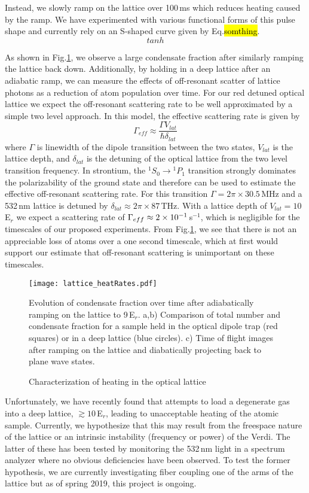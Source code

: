 Instead, we slowly ramp on the lattice over 100\,ms which reduces heating caused by the ramp. 
We have experimented with various functional forms of this pulse shape and currently rely on an S-shaped curve given by Eq.\hl{somthing}.
\begin{equation}
	tanh
\end{equation}

As shown in Fig.\;\ref{fig:heatingRates}, we observe a large condensate fraction after similarly ramping the lattice back down. 
Additionally, by holding in a deep lattice after an adiabatic ramp, we can measure the effects of off-resonant scatter of lattice photons as a reduction of atom population over time.
For our red detuned optical lattice we expect the off-resonant scattering rate to be well approximated by a simple two level approach. In this model, the effective scattering rate is given by \cite{Jaksch2005}
	\begin{equation} \label{eq:offResScatter}
		\Gamma_{eff} \approx \frac{\Gamma V_{lat}}{\hbar \delta_{lat}}
	\end{equation}
where $\Gamma$ is linewidth of the dipole transition between the two states, $V_{lat}$ is the lattice depth, and $\delta_{lat}$ is the detuning of the optical lattice from the two level transition frequency.
In strontium, the $^1S_0\!\rightarrow\!^1P_1$ transition strongly dominates the polarizability of the ground state and therefore can be used to estimate the effective off-resonant scattering rate.
For this transition $\Gamma = 2 \pi \times 30.5\,$MHz and a 532\,nm lattice is detuned by $\delta_{lat} \approx 2 \pi \times 87\,$THz.
With a lattice depth of $V_{lat}=10\,$E$_r$ we expect a scattering rate of $\Gamma_{eff} \approx 2\times 10^{-1}\,$s$^{-1}$, which is negligible for the timescales of our proposed experiments.
From Fig.\;\ref{fig:heatingRates}, we see that there is not an appreciable loss of atoms over a one second timescale, which at first would support our estimate that off-resonant scattering is unimportant on these timescales.
	\begin{figure}
	\centerline{
		\texttt{[image: lattice\_heatRates.pdf]}}
		\caption{Characterization of heating in the optical lattice}{Evolution of condensate fraction over time after adiabatically ramping on the lattice to 9\,E$_r$. a,b) Comparison of total number and condensate fraction for a sample held in the optical dipole trap (red squares) or in a deep lattice (blue circles). c) Time of flight images after ramping on the lattice and diabatically projecting back to plane wave states.}
		 \label{fig:heatingRates}
	\end{figure}
Unfortunately, we have recently found that attempts to load a degenerate gas into a deep lattice, $\gtrsim 10$\,E$_r$, leading to unacceptable heating of the atomic sample.
Currently, we hypothesize that this may result from the freespace nature of the lattice or an intrinsic instability (frequency or power) of the Verdi.
The latter of these has been tested by monitoring the 532\,nm light in a spectrum analyzer where no obvious deficiencies have been observed.
To test the former hypothesis, we are currently investigating fiber coupling one of the arms of the lattice but as of spring 2019, this project is ongoing.

